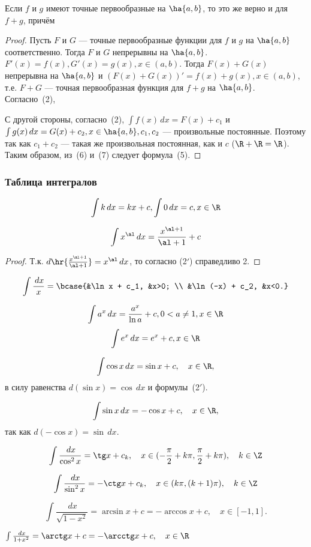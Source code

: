 \documentclass[a4paper]{article}
\begin{document}
\begin{prop}
Если $f$ и $g$ имеют точные первообразные на $\ha{a,b}$, то это же
верно и для $f + g$, причём 
\end{prop}
\begin{proof}
Пусть $F$ и $G$ --- точные первообразные функции для $f$ и $g$ на
$\ha{a,b}$ соответственно. Тогда $F$ и $G$ непрерывны на $\ha{a,b}$.
$F'(x)=f(x), G'(x)=g(x), x \in (a,b)$. Тогда $F(x)+G(x)$ непрерывна
на $\ha{a,b}$ и $(F(x) + G(x))'=f(x) + g(x), x \in (a,b)$, т.е. $F +
G$ --- точная первообразная функция для $f + g$ на $\ha{a,b}$.
Согласно~(2), 

С другой стороны, согласно~(2), $\int f(x)\,dx=F(x) + c_1$ и $\int
g(x)\,dx=G(x) + c_2, x \in \ha{a,b}, c_1, c_2$ --- произвольные
постоянные. Поэтому  так как $c_1  +  c_2$ --- такая же произвольная постоянная, как и
$c$ ($\R+\R=\R$). Таким образом, из~(6) и~(7) следует формула~(5).
\end{proof}


\subsubsection{Таблица интегралов}

\begin{nums}{-2}
\item $$\int k\,dx= kx  +  c, \int 0\,dx=c, x\in\R$$
\item $$\int x^\al \,dx=\frac{x^{\al+1}}{\al+1}+c$$

\begin{proof}
Т.к. $d\hr{\frac{x^{\al+1}}{\al+1}}=x^\al \,dx$, то
согласно (2$'$) справедливо 2.
\end{proof}
\item $$\int\frac{\,dx}{x}=\bcase{&\ln x + c_1, &x>0; \\ &\ln(-x) + c_2, &x<0.}$$
\item $$\int a^x \,dx=\frac{a^x}{\ln a} + c, 0<a\ne 1, x\in\R$$
$$\int e^x \,dx=e^x + c, x\in\R$$
\item $$\int\cos x \,dx=\sin x + c, \quad x \in\R,$$ в силу равенства $d(\sin x)=\cos \,dx$ и формулы~(2$'$).
\item $$\int\sin x \,dx=-\cos x + c, \quad x \in\R,$$ так как $d(-\cos x)=\sin \,dx$.
\item $$\int\frac{\,dx}{\cos^2 x}=\tg x + c_k, \quad x \in (-\frac{\pi}{2}+k\pi, \frac{\pi}{2}+k\pi), \quad k \in \Z$$
\item $$\int\frac{\,dx}{\sin^2 x}=-\ctg x + c_k, \quad  x\in (k\pi, (k+1)\pi),  \quad k \in \Z$$
\item $$\int\frac{\,dx}{\sqrt{1-x^2}}=\arcsin x + c = -\arccos x + c,  \quad x \in [-1,1].$$
\item $\int\frac{\,dx}{1+x^2}=\arctg x + c = -\arcctg x + c, \quad x\in\R$
\end{nums}
\end{document}
